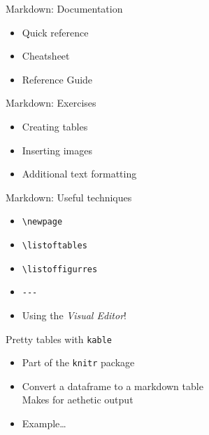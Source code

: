 \documentclass[
  ignorenonframetext,
]{beamer}
\providecommand{\tightlist}{%
  \setlength{\itemsep}{0pt}\setlength{\parskip}{0pt}}
\begin{document}
\begin{frame}{Markdown: Documentation}
\protect\hypertarget{markdown-documentation}{}
\begin{itemize}
\tightlist
\item
  Quick reference
\item
  Cheatsheet
\item
  Reference Guide
\end{itemize}
\end{frame}

\begin{frame}{Markdown: Exercises}
\protect\hypertarget{markdown-exercises}{}
\begin{itemize}
\tightlist
\item
  Creating tables
\item
  Inserting images
\item
  Additional text formatting
\end{itemize}
\end{frame}

\begin{frame}[fragile]{Markdown: Useful techniques}
\protect\hypertarget{markdown-useful-techniques}{}
\begin{itemize}
\tightlist
\item
  \texttt{\textbackslash{}newpage}
\item
  \texttt{\textbackslash{}listoftables}
\item
  \texttt{\textbackslash{}listoffigurres}
\item
  \texttt{-\/-\/-}
\item
  Using the \emph{Visual Editor}!
\end{itemize}
\end{frame}

\begin{frame}[fragile]{Pretty tables with \texttt{kable}}
\protect\hypertarget{pretty-tables-with-kable}{}
\begin{itemize}
\tightlist
\item
  Part of the \texttt{knitr} package
\item
  Convert a dataframe to a markdown table\\
  Makes for aethetic output
\item
  Example\ldots{}
\end{itemize}
\end{frame}
\end{document}
